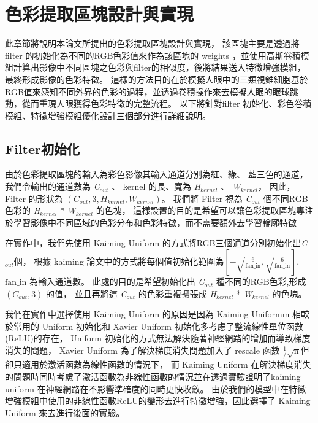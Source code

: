 \documentclass[class=NCU_thesis, crop=false]{standalone}
\begin{document}
\pagebreak

\section{色彩提取區塊設計與實現}

此章節將說明本論文所提出的色彩提取區塊設計與實現，
該區塊主要是透過將 filter 的初始化為不同的RGB色彩值來作為該區塊的 weights ，並使用高斯卷積模組計算出影像中不同區塊之色彩與filter的相似度，後將結果送入特徵增強模組，最終形成影像的色彩特徵。
這樣的方法目的在於模擬人眼中的三類視錐細胞基於RGB值來感知不同外界的色彩的過程，並透過卷積操作來去模擬人眼的眼球跳動，從而重現人眼獲得色彩特徵的完整流程。
以下將針對filter 初始化、彩色卷積模組、特徵增強模組優化設計三個部分進行詳細說明。

	\subsection{Filter初始化}

	由於色彩提取區塊的輸入為彩色影像其輸入通道分別為紅、綠、 藍三色的通道，
	我們令輸出的通道數為 \textit{C}$_{out}$ 、 kernel 的長、寬為 \textit{H}$_{kernel}$ 、 \textit{W}$_{kernel}$，
	因此， Filter 的形狀為 $\left(C_{out} , 3, H_{kernel}, W_{kernel}\right)$。
	我們將 Filter 視為 \textit{C}$_{out}$ 個不同RGB色彩的 \textit{H}$_{kernel}$ * \textit{W}$_{kernel}$ 的色塊，
	這樣設置的目的是希望可以讓色彩提取區塊專注於學習影像中不同區域的色彩分布和色彩特徵，而不需要額外去學習輪廓特徵

	在實作中，我們先使用 Kaiming Uniform 的方式將RGB三個通道分別初始化出\textit{C}$_{out}$個，
	根據 kaiming 論文\cite{DBLP:journals/corr/HeZR015}中的方式將每個值初始化範圍為$[-\sqrt{\frac{6}{\text{fan\_in}}}, \sqrt{\frac{6}{\text{fan\_in}}}]$,
	$\text{fan\_in}$ 為輸入通道數。
	此處的目的是希望初始化出 \textit{C}$_{out}$ 種不同的RGB色彩,形成 $\left(C_{out} , 3\right)$ 的值，
	並且再將這 \textit{C}$_{out}$ 的色彩重複擴張成 \textit{H}$_{kernel}$ * \textit{W}$_{kernel}$ 的色塊。

	我們在實作中選擇使用 Kaiming Uniform 的原因是因為 Kaiming Uniformm 相較於常用的 Uniform 初始化和 Xavier Uniform\cite{pmlr-v9-glorot10a} 初始化多考慮了整流線性單位函數(ReLU)的存在，
	Uniform 初始化的方式無法解決隨著神經網路的增加而導致梯度消失的問題，
	Xavier Uniform 為了解決梯度消失問題加入了 rescale 函數 $\frac{1} / \sqrt{\text{n}}$但卻只適用於激活函數為線性函數的情況下，
	而 Kaiming Uniform 在解決梯度消失的問題時同時考慮了激活函數為非線性函數的情況並在\cite{DBLP:journals/corr/HeZR015}透過實驗證明了kaiming uniform 在神經網路在不影響準確度的同時更快收斂。
	由於我們的模型中在特徵增強模組中使用的非線性函數ReLU的變形去進行特徵增強，因此選擇了 Kaiming Uniform 來去進行後面的實驗。
\end{document}
